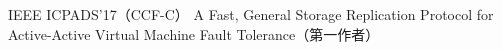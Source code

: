 \cvpub
{IEEE ICPADS'17（CCF-C）} %
{A Fast, General Storage Replication Protocol for Active-Active Virtual Machine Fault  Tolerance（第一作者）} %
{} %
{} %
{ %
}
